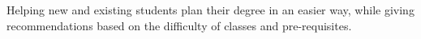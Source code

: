 Helping new and existing students plan their degree in an easier way, while giving recommendations based on the difficulty of classes and pre-requisites.
